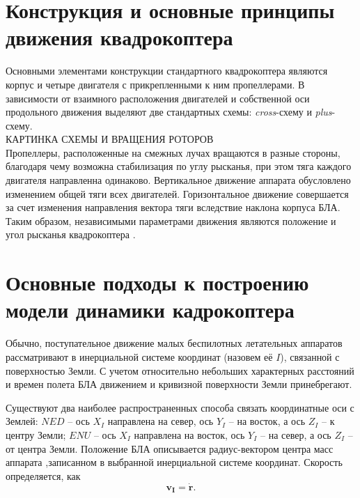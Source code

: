 \section{Конструкция и основные принципы движения квадрокоптера}

Основными элементами конструкции стандартного квадрокоптера являются корпус и четыре двигателя с прикрепленными к ним пропеллерами. В зависимости от взаимного расположения двигателей и собственной оси продольного движения выделяют две стандартных схемы: \textit{cross}-схему и \textit{plus}-схему\cite{Bashi01}.
\\

КАРТИНКА СХЕМЫ И ВРАЩЕНИЯ РОТОРОВ
\\

Пропеллеры, расположенные на смежных лучах вращаются в разные стороны, благодаря чему возможна стабилизация по углу рысканья, при этом тяга каждого двигателя направленна одинаково. Вертикальное движение аппарата обусловлено изменением общей тяги всех двигателей. Горизонтальное движение совершается за счет изменения направления вектора тяги вследствие наклона корпуса БЛА. Таким образом, независимыми параметрами движения являются положение и угол рысканья квадрокоптера \cite{Salih01}. 

\section{Основные подходы к построению модели динамики кадрокоптера}
	
Обычно, поступательное движение малых беспилотных летательных аппаратов рассматривают в инерциальной системе координат (назовем её {$I$}), связанной с поверхностью Земли. С учетом относительно небольших характерных расстояний и времен полета БЛА движением и кривизной поверхности Земли принебрегают.

Существуют два наиболее распространенных способа связать координатные оси с Землей: {$NED$} --  ось \textbf{$X_I$} направлена на север, ось \textbf{$Y_I$} -- на восток, а ось \textbf{$Z_I$} -- к центру Земли; {$ENU$} -- ось \textbf{$X_I$} направлена на восток, ось \textbf{$Y_I$} -- на север, а ось \textbf{$Z_I$} -- от центра Земли. Положение БЛА описывается радиус-вектором центра масс аппарата ,записанном в выбранной инерциальной системе координат. Скорость определяется, как
\begin{equation} \label{eq:velocity}
\bm{v_I} = \dot{\bm{r}}.
\end{equation}

